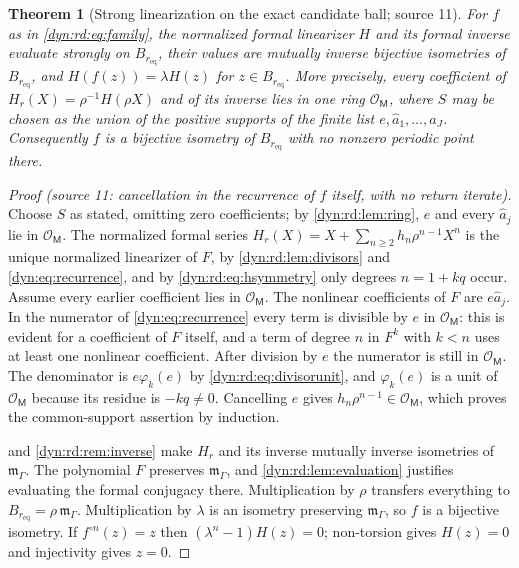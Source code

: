 \documentclass[11pt,letterpaper]{article}
\newtheorem{theorem}{Theorem}[section]
\theoremstyle{definition}
\theoremstyle{remark}
\newcommand{\OO}{\mathcal O}
\newcommand{\m}{\mathfrak m}
\numberwithin{equation}{section}
\begin{document}
\begin{theorem}[Strong linearization on the exact candidate ball; source 11]
\label{dyn:rd:thm:linearization}
For $f$ as in \eqref{dyn:rd:eq:family}, the normalized formal linearizer
$H$ and its formal inverse evaluate strongly on $B_{r_{\mathrm{eq}}}$, their
values are mutually inverse bijective isometries of $B_{r_{\mathrm{eq}}}$,
and $H(f(z))=\lambda H(z)$ for $z\in B_{r_{\mathrm{eq}}}$. More precisely,
every coefficient of $H_r(X)=\rho^{-1}H(\rho X)$ and of its inverse lies in
one ring $\OO_{\mathsf M}$, where $S$ may be chosen as the union of the
positive supports of the finite list $e,\hat a_1,\dots,\hat a_J$.
Consequently $f$ is a bijective isometry of $B_{r_{\mathrm{eq}}}$ with no
nonzero periodic point there.
\end{theorem}
\begin{proof}[Proof \textup{(source 11: cancellation in the recurrence of
$f$ itself, with no return iterate)}]
Choose $S$ as stated, omitting zero coefficients; by
\cref{dyn:rd:lem:ring}, $e$ and every $\hat a_j$ lie in $\OO_{\mathsf M}$.
The normalized formal series $H_r(X)=X+\sum_{n\ge2}h_n\rho^{n-1}X^{n}$ is
the unique normalized linearizer of $F$, by
\cref{dyn:rd:lem:divisors} and \eqref{dyn:eq:recurrence}, and by
\eqref{dyn:rd:eq:hsymmetry} only degrees $n=1+kq$ occur. Assume every
earlier coefficient lies in $\OO_{\mathsf M}$. The nonlinear coefficients of
$F$ are $e\hat a_j$. In the numerator of \eqref{dyn:eq:recurrence} every
term is divisible by $e$ in $\OO_{\mathsf M}$: this is evident for a
coefficient of $F$ itself, and a term of degree $n$ in $F^{k}$ with $k<n$
uses at least one nonlinear coefficient. After division by $e$ the numerator
is still in $\OO_{\mathsf M}$. The denominator is $e\varphi_k(e)$ by
\eqref{dyn:rd:eq:divisorunit}, and $\varphi_k(e)$ is a unit of
$\OO_{\mathsf M}$ because its residue is $-kq\ne0$. Cancelling $e$ gives
$h_n\rho^{n-1}\in\OO_{\mathsf M}$, which proves the common-support
assertion by induction.

 and \cref{dyn:rd:rem:inverse} make $H_r$ and its
inverse mutually inverse isometries of $\m_\Gamma$. The polynomial $F$
preserves $\m_\Gamma$, and \cref{dyn:rd:lem:evaluation} justifies evaluating
the formal conjugacy there. Multiplication by $\rho$ transfers everything to
$B_{r_{\mathrm{eq}}}=\rho\,\m_\Gamma$. Multiplication by $\lambda$ is an
isometry preserving $\m_\Gamma$, so $f$ is a bijective isometry. If
$f^{\circ n}(z)=z$ then $(\lambda^{n}-1)H(z)=0$; non-torsion gives
$H(z)=0$ and injectivity gives $z=0$.
\end{proof}
\end{document}
